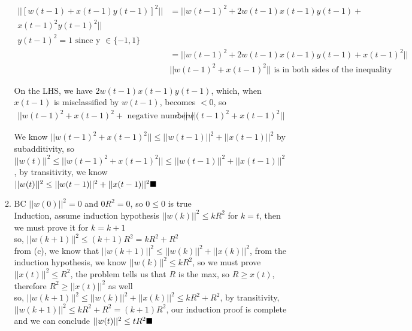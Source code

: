 \documentclass{article}
\begin{document}
\begin{enumerate}
\begin{enumerate}[label=(\alph*)]
            \begin{align*}
                ||[w(t-1) + x(t-1)y(t-1)]^2|| &= ||w(t-1)^2 + 2w(t-1)x(t-1)y(t-1) +\\x(t-1)^2y(t-1)^2||\\
                y(t-1)^2 = 1 \text{ since y } \in\{-1, 1\}\\
                &=||w(t-1)^2 + 2w(t-1)x(t-1)y(t-1) + x(t-1)^2||\\
                &||w(t-1)^2+x(t-1)^2|| \text{ is in both sides of the inequality}
            \end{align*}

            On the LHS, we have $2w(t-1)x(t-1)y(t-1)$, which, when $x(t-1)$ is misclassified by $w(t-1)$, becomes $<0$, so
            \begin{align*}
                ||w(t-1)^2 + x(t-1)^2 + \text{ negative number }|| &<||w(t-1)^2+x(t-1)^2||
            \end{align*}
            
            We know $||w(t-1)^2 + x(t-1)^2|| \leq ||w(t-1)||^2 + ||x(t-1)||^2$ by subadditivity, so $||w(t)||^2 \leq ||w(t-1)^2 + x(t-1)^2|| \leq ||w(t-1)||^2 + ||x(t-1)||^2$, by transitivity, we know \\ $||w(t)||^2 \leq ||w(t-1)||^2 + ||x(t-1)||^2 \hfill \blacksquare$
        
            \item BC $||w(0)||^2 = 0$ and $0R^2 = 0$, so $0 \leq 0$ is true\\[0.25in]
            Induction, assume induction hypothesis $||w(k)||^2 \leq kR^2$ for $k = t$, then we must prove it for $k = k + 1$\\[0.25in]
            so, $||w(k+1)||^2 \leq (k+1)R^2 = kR^2 + R^2$\\[0.25in]
            from (c), we know that $||w(k+1)||^2 \leq ||w(k)||^2 + ||x(k)||^2$, from the induction hypothesis, we know $||w(k)||^2 \leq kR^2$, so we must prove $||x(t)||^2 \leq R^2$, the problem tells us that $R$ is the max, so $R \geq x(t)$, therefore $R^2 \geq ||x(t)||^2$ as well\\[0.25in]
            so, $||w(k+1)||^2 \leq ||w(k)||^2 + ||x(k)||^2 \leq kR^2 + R^2$, by transitivity, $||w(k+1)||^2 \leq kR^2 + R^2 = (k + 1)R^2$, our induction proof is complete and we can conclude $||w(t)||^2 \leq tR^2 \hfill \blacksquare$
            

\end{enumerate}
\end{enumerate}
\end{document}
